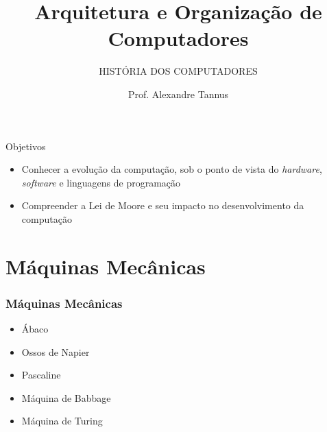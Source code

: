 \documentclass[aspectratio=169,
				xcolor=table]{beamer}
\institute[]{\uppercase{Engenharia de Software}}
\title[]{Arquitetura e Organização de Computadores}
\subtitle[]{\uppercase{História dos Computadores}}
\author[]{Prof. Alexandre Tannus}
\date{}
\begin{document}
	\begin{frame}
		\titlepage
	\end{frame}

	\begin{frame}{Objetivos}
		\begin{itemize}
			\item Conhecer a evolução da computação, sob o ponto de vista do \textit{hardware}, \textit{software} e linguagens de programação 
			\vspace{1em}
			\item Compreender a Lei de Moore e seu impacto no desenvolvimento da computação
		\end{itemize}
	\end{frame}
	

	\begin{frame}
		\tableofcontents
	\end{frame}	
	
	\section{Máquinas Mecânicas}
	\begin{frame}
		\frametitle{Máquinas Mecânicas}
		\begin{itemize}
			\item Ábaco
			\item Ossos de Napier
			\item Pascaline
			\item Máquina de Babbage
			\item Máquina de Turing
		\end{itemize}
	\end{frame}
	
\end{document}
